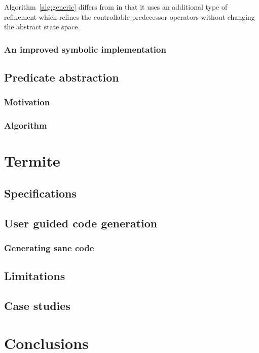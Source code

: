 \documentclass{article}
\begin{document}
Algorithm~\ref{alg:generic} differs from \cite{Alfaro_Roy_07}
in that it uses an additional type of refinement which refines the 
controllable predecessor operators without changing the abstract
state space.


\subsubsection{An improved symbolic implementation}

\subsection{Predicate abstraction}
\subsubsection{Motivation}
\subsubsection{Algorithm}

\section{Termite}

\subsection{Specifications}
\subsection{User guided code generation}
\subsubsection{Generating sane code}

\subsection{Limitations}

\subsection{Case studies}

\section{Conclusions}
\end{document}
